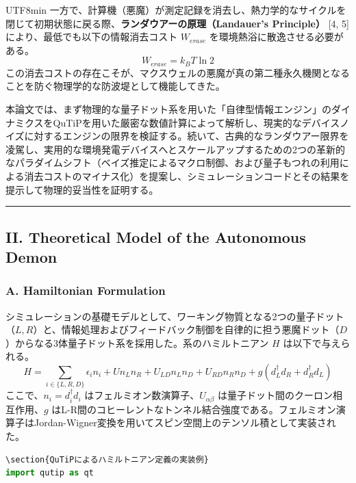 \documentclass[a4paper,11pt,twocolumn]{article}
\begin{document}
\begin{CJK*}{UTF8}{min}
一方で、計算機（悪魔）が測定記録を消去し、熱力学的なサイクルを閉じて初期状態に戻る際、\textbf{ランダウアーの原理（Landauer's Principle）} [4, 5] により、最低でも以下の情報消去コスト $W_{erase}$ を環境熱浴に散逸させる必要がある。
\begin{equation} W_{erase} = k_B T \ln 2 \end{equation}
この消去コストの存在こそが、マクスウェルの悪魔が真の第二種永久機関となることを防ぐ物理学的な防波堤として機能してきた。

本論文では、まず物理的な量子ドット系を用いた「自律型情報エンジン」のダイナミクスをQuTiPを用いた厳密な数値計算によって解析し、現実的なデバイスノイズに対するエンジンの限界を検証する。続いて、古典的なランダウアー限界を凌駕し、実用的な環境発電デバイスへとスケールアップするための2つの革新的なパラダイムシフト（ベイズ推定によるマクロ制御、および量子もつれの利用による消去コストのマイナス化）を提案し、シミュレーションコードとその結果を提示して物理的妥当性を証明する。

\vspace{1em}\hrule\vspace{1em}

\subsection{II. Theoretical Model of the Autonomous Demon}

\subsubsection{A. Hamiltonian Formulation}
シミュレーションの基礎モデルとして、ワーキング物質となる2つの量子ドット（$L, R$）と、情報処理およびフィードバック制御を自律的に担う悪魔ドット（$D$）からなる3体量子ドット系を採用した。系のハミルトニアン $H$ は以下で与えられる。
\begin{equation} H = \sum_{i \in \{L, R, D\}} \epsilon_i n_i + U n_L n_R + U_{LD} n_L n_D + U_{RD} n_R n_D + g(d_L^\dagger d_R + d_R^\dagger d_L) \end{equation}
ここで、$n_i = d_i^\dagger d_i$ はフェルミオン数演算子、$U_{\alpha \beta}$ は量子ドット間のクーロン相互作用、$g$ はL-R間のコヒーレントなトンネル結合強度である。フェルミオン演算子はJordan-Wigner変換を用いてスピン空間上のテンソル積として実装された。

\begin{lstlisting}[language=Python]
\section{QuTiPによるハミルトニアン定義の実装例}
import qutip as qt


\end{lstlisting}
\end{CJK*}
\end{document}
